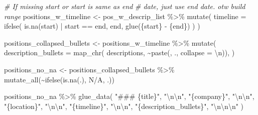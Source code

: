 \documentclass[
]{article}
\newenvironment{Shaded}{\begin{snugshade}}{\end{snugshade}}
\newcommand{\AttributeTok}[1]{\textcolor[rgb]{0.77,0.63,0.00}{#1}}
\newcommand{\CommentTok}[1]{\textcolor[rgb]{0.56,0.35,0.01}{\textit{#1}}}
\newcommand{\FunctionTok}[1]{\textcolor[rgb]{0.00,0.00,0.00}{#1}}
\newcommand{\NormalTok}[1]{#1}
\newcommand{\OtherTok}[1]{\textcolor[rgb]{0.56,0.35,0.01}{#1}}
\newcommand{\SpecialCharTok}[1]{\textcolor[rgb]{0.00,0.00,0.00}{#1}}
\newcommand{\StringTok}[1]{\textcolor[rgb]{0.31,0.60,0.02}{#1}}
\begin{document}
\begin{Shaded}
\begin{Highlighting}[]
\CommentTok{\# If missing start or start is same as end}
\CommentTok{\# date, just use end date. otw build range}
\NormalTok{positions\_w\_timeline }\OtherTok{\textless{}{-}}\NormalTok{ pos\_w\_descrip\_list }\SpecialCharTok{\%\textgreater{}\%} 
  \FunctionTok{mutate}\NormalTok{(}
    \AttributeTok{timeline =} \FunctionTok{ifelse}\NormalTok{(}
      \FunctionTok{is.na}\NormalTok{(start) }\SpecialCharTok{|}\NormalTok{ start }\SpecialCharTok{==}\NormalTok{ end,}
\NormalTok{      end,}
      \FunctionTok{glue}\NormalTok{(}\StringTok{\textquotesingle{}\{start\} {-} \{end\}\textquotesingle{}}\NormalTok{)}
\NormalTok{    )}
\NormalTok{  )}

\NormalTok{positions\_collapsed\_bullets }\OtherTok{\textless{}{-}}\NormalTok{ positions\_w\_timeline }\SpecialCharTok{\%\textgreater{}\%} 
  \FunctionTok{mutate}\NormalTok{(}
     \AttributeTok{description\_bullets =} \FunctionTok{map\_chr}\NormalTok{(}
\NormalTok{       descriptions, }
       \SpecialCharTok{\textasciitilde{}}\FunctionTok{paste}\NormalTok{(}\StringTok{\textquotesingle{}{-}\textquotesingle{}}\NormalTok{, ., }\AttributeTok{collapse =} \StringTok{\textquotesingle{}}\SpecialCharTok{\textbackslash{}n}\StringTok{\textquotesingle{}}\NormalTok{)),}
\NormalTok{  )}

\NormalTok{positions\_no\_na }\OtherTok{\textless{}{-}}\NormalTok{ positions\_collapsed\_bullets }\SpecialCharTok{\%\textgreater{}\%} 
  \FunctionTok{mutate\_all}\NormalTok{(}\SpecialCharTok{\textasciitilde{}}\FunctionTok{ifelse}\NormalTok{(}\FunctionTok{is.na}\NormalTok{(.), }\StringTok{\textquotesingle{}N/A\textquotesingle{}}\NormalTok{, .))}
\end{Highlighting}
\end{Shaded}

\begin{Shaded}
\begin{Highlighting}[]
\NormalTok{positions\_no\_na }\SpecialCharTok{\%\textgreater{}\%} 
  \FunctionTok{glue\_data}\NormalTok{(}
   \StringTok{"\#\#\# \{title\}"}\NormalTok{,}
   \StringTok{"}\SpecialCharTok{\textbackslash{}n\textbackslash{}n}\StringTok{"}\NormalTok{,}
   \StringTok{"\{company\}"}\NormalTok{,}
   \StringTok{"}\SpecialCharTok{\textbackslash{}n\textbackslash{}n}\StringTok{"}\NormalTok{,}
   \StringTok{"\{location\}"}\NormalTok{,}
   \StringTok{"}\SpecialCharTok{\textbackslash{}n\textbackslash{}n}\StringTok{"}\NormalTok{,}
   \StringTok{"\{timeline\}"}\NormalTok{, }
   \StringTok{"}\SpecialCharTok{\textbackslash{}n\textbackslash{}n}\StringTok{"}\NormalTok{,}
   \StringTok{"\{description\_bullets\}"}\NormalTok{,}
   \StringTok{"}\SpecialCharTok{\textbackslash{}n\textbackslash{}n\textbackslash{}n}\StringTok{"}
\NormalTok{ )}
\end{Highlighting}
\end{Shaded}
\end{document}
